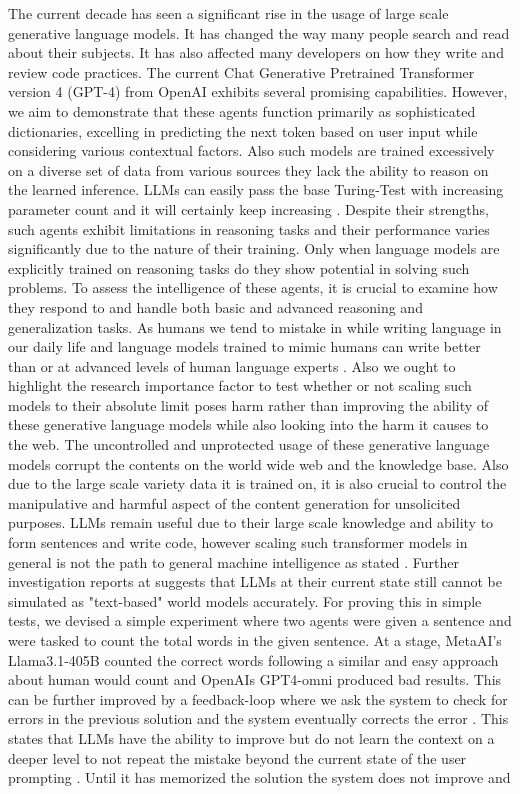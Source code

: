\documentclass[pdflatex,sn-mathphys-num]{sn-jnl}%
\theoremstyle{thmstyleone}%
\theoremstyle{thmstyletwo}%
\theoremstyle{thmstylethree}%
\begin{document}
The current decade has seen a significant rise in the usage of large scale generative language models. It has changed the way many people search and read about their subjects. It has also affected many developers on how they write and review code practices. The current Chat Generative Pretrained Transformer version 4 (GPT-4) from OpenAI \cite{bib1} exhibits several promising capabilities. However, we aim to demonstrate that these agents function primarily as sophisticated dictionaries, excelling in predicting the next token based on user input while considering various contextual factors. Also such models are trained excessively on a diverse set of data from various sources they lack the ability to reason on the learned inference. LLMs can easily pass the base Turing-Test with increasing parameter count and it will certainly keep increasing \cite{turinggpttest}. Despite their strengths, such agents exhibit limitations in reasoning tasks and their performance varies significantly due to the nature of their training. Only when language models are explicitly trained on reasoning tasks do they show potential in solving such problems. To assess the intelligence of these agents, it is crucial to examine how they respond to and handle both basic and advanced reasoning and generalization tasks. As humans we tend to mistake in while writing language in our daily life and language models trained to mimic humans can write better than or at advanced levels of human language experts \cite{bib2}. Also we ought to highlight the research importance factor to test whether or not scaling such models to their absolute limit poses harm rather than improving the ability of these generative language models while also looking into the harm it causes to the web. The uncontrolled and unprotected usage of these generative language models corrupt the contents on the world wide web and the knowledge base. Also due to the large scale variety data it is trained on, it is also crucial to control the manipulative and harmful aspect of the content generation for unsolicited purposes. LLMs remain useful due to their large scale knowledge and ability to form sentences and write code, however scaling such transformer models in general is not the path to general machine intelligence as stated \cite{lecun2022path}. Further investigation reports at \cite{wang2024languagemodelsservetextbased} suggests that LLMs at their current state still cannot be simulated as "text-based" world models accurately. For proving this in simple tests, we devised a simple experiment where two agents were given a sentence and were tasked to count the total words in the given sentence. At a stage, MetaAI's Llama3.1-405B \cite{dubey2024llama} counted the correct words following a similar and easy approach about human would count and OpenAIs GPT4-omni produced bad results. This can be further improved by a feedback-loop where we ask the system to check for errors in the previous solution and the system eventually corrects the error \cite{llmsfewshotlearners}. This states that LLMs have the ability to improve but do not learn the context on a deeper level to not repeat the mistake beyond the current state of the user prompting \cite{kamoi2024llmsactuallycorrectmistakes}. Until it has memorized the solution the system does not improve and 
\end{document}
